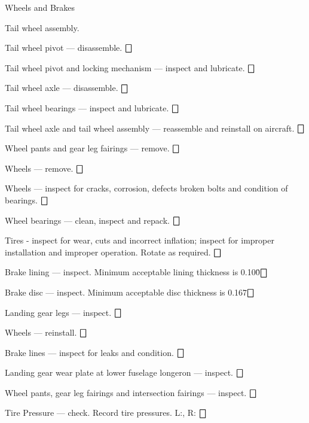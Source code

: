 \begin{enumerate*}
\begin{enumerate*}
	\end{enumerate*}
	\item{Wheels and Brakes} 
	\begin{enumerate*}
		\item Tail wheel assembly. 
		\begin{enumerate*}
		  \item Tail wheel pivot --- disassemble. \dotfill $\bigbox$
		  \item Tail wheel pivot and locking mechanism --- inspect and lubricate. \dotfill $\bigbox$
		  \item Tail wheel axle --- disassemble. \dotfill $\bigbox$
		  \item Tail wheel bearings --- inspect and lubricate. \dotfill $\bigbox$
		  \item Tail wheel axle and tail wheel assembly --- reassemble and reinstall on aircraft. \dotfill $\bigbox$
	  \end{enumerate*}
		\item Wheel pants and gear leg fairings --- remove. \dotfill $\bigbox$
		\item Wheels --- remove. \dotfill $\bigbox$
		\item Wheels --- inspect for cracks, corrosion, defects broken bolts and condition of bearings. \dotfill $\bigbox$
		\item Wheel bearings --- clean, inspect and repack. \dotfill $\bigbox$
		\item Tires - inspect for wear, cuts and incorrect inflation; inspect for improper installation and improper operation. Rotate as required. \dotfill $\bigbox$
		\item Brake lining --- inspect. Minimum acceptable lining thickness is 0.100\" \dotfill $\bigbox$
		\item Brake disc --- inspect. Minimum acceptable disc thickness is 0.167\" \dotfill $\bigbox$
		\item Landing gear legs --- inspect. \dotfill $\bigbox$
		\item Wheels --- reinstall. \dotfill $\bigbox$
		\item Brake lines --- inspect for leaks and condition. \dotfill $\bigbox$
		\item Landing gear wear plate at lower fuselage longeron --- inspect. \dotfill $\bigbox$
		\item Wheel pants, gear leg fairings and intersection fairings --- inspect. \dotfill $\bigbox$
		\item Tire Pressure --- check. Record tire pressures. L:\underline{\makebox[0.5in][l]{}}, R:\underline{\makebox[0.5in][l]{}} \dotfill $\bigbox$

\end{enumerate*}
\end{enumerate*}
